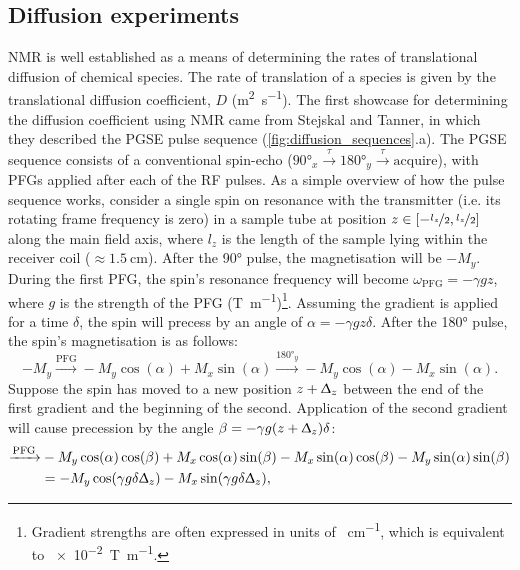 \subsection{Diffusion experiments}
\label{subsec:diffusion_experiments}
\ac{NMR} is well established as a means of determining the rates of
translational diffusion of chemical species\cite{Johnson1999,Morris2009b}.
The rate of translation of a species is given by the translational
diffusion coefficient, $D$ (\unit{\meter\squared\per\second})\cite[Chapter
19]{Atkins2014}.
The first showcase for determining the diffusion coefficient using \ac{NMR}
came from Stejskal and Tanner, in which they described the \ac{PGSE} pulse
sequence\cite{Stejskal1965} (\cref{fig:diffusion_sequences}.a).
The \ac{PGSE} sequence consists of a conventional spin-echo ($\ang{90}_x
\xrightarrow{\tau} \ang{180}_y \xrightarrow{\tau} \text{acquire}$), with
\acp{PFG} applied after each of the \ac{RF} pulses.
As a simple overview of how the pulse sequence works, consider a single spin on
resonance with the transmitter (i.e. its rotating frame frequency is zero) in a
sample tube at position $z \in [-\nicefrac{l_z}{2}, \nicefrac{l_z}{2}]$ along
the main field axis, where $l_z$ is the length of the sample lying within the
receiver coil ($\approx \qty{1.5}{\centi\meter}$).
After the \ang{90} pulse, the magnetisation will be $-M_y$.
During the first \ac{PFG}, the spin's resonance frequency will become
$\omega_{\text{PFG}} = -\gamma g z$, where $g$ is the strength of the \ac{PFG}
(\unit{\tesla\per\meter})\footnote{
    Gradient strengths are often expressed in units of
    \unit{\gauss\per\centi\meter}, which is equivalent to
    \qty[print-unity-mantissa = false]{e-2}{\tesla\per\meter}.
}.
Assuming the gradient is applied for a time $\delta$, the spin will
precess by an angle of  $\alpha = -\gamma g z \delta$. After the \ang{180}
pulse, the spin's magnetisation is as follows:
\[
    -M_y
    \xrightarrow{\text{PFG}} -M_y \cos(\alpha) + M_x \sin(\alpha)
    \xrightarrow{\ang{180}_y} -M_y \cos(\alpha) - M_x \sin(\alpha).
\]
Suppose the spin has moved to a new position $z + \Updelta_z$
between the end of the first gradient and the beginning of the second.
Application of the second gradient will cause precession by the angle
$\beta = -\gamma g (z + \Updelta_z) \delta$:
\begin{equation*}
   \begin{split}
        \xrightarrow{\text{PFG}}
            &-M_y \cos(\alpha)\cos(\beta) +
            M_x \cos(\alpha)\sin(\beta) -
            M_x \sin(\alpha)\cos(\beta) -
            M_y \sin(\alpha)\sin(\beta)\\
        &= -M_y \cos(\gamma g \delta \Updelta_z) -
           M_x \sin(\gamma g \delta \Updelta_z),
   \end{split}
\end{equation*}
